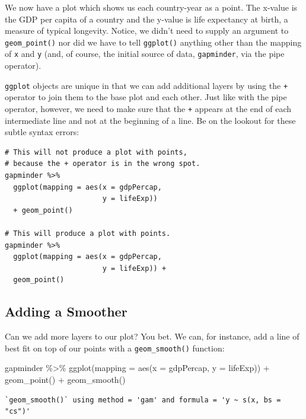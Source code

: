 \documentclass[
  letterpaper,
]{book}
\newenvironment{Shaded}{\begin{snugshade}}{\end{snugshade}}
\newcommand{\AttributeTok}[1]{\textcolor[rgb]{0.40,0.45,0.13}{#1}}
\newcommand{\FunctionTok}[1]{\textcolor[rgb]{0.28,0.35,0.67}{#1}}
\newcommand{\NormalTok}[1]{\textcolor[rgb]{0.00,0.23,0.31}{#1}}
\newcommand{\SpecialCharTok}[1]{\textcolor[rgb]{0.37,0.37,0.37}{#1}}
\begin{document}
We now have a plot which shows us each country-year as a point. The
x-value is the GDP per capita of a country and the y-value is life
expectancy at birth, a measure of typical longevity. Notice, we didn't
need to supply an argument to \texttt{geom\_point()} nor did we have to
tell \texttt{ggplot()} anything other than the mapping of \texttt{x} and
\texttt{y} (and, of course, the initial source of data,
\texttt{gapminder}, via the pipe operator).

\texttt{ggplot} objects are unique in that we can add additional layers
by using the \texttt{+} operator to join them to the base plot and each
other. Just like with the pipe operator, however, we need to make sure
that the \texttt{+} appears at the end of each intermediate line and not
at the beginning of a line. Be on the lookout for these subtle syntax
errors:

\begin{verbatim}
# This will not produce a plot with points, 
# because the + operator is in the wrong spot.
gapminder %>%
  ggplot(mapping = aes(x = gdpPercap, 
                       y = lifeExp)) 
  + geom_point()
  
# This will produce a plot with points.
gapminder %>%
  ggplot(mapping = aes(x = gdpPercap, 
                       y = lifeExp)) +
  geom_point()
\end{verbatim}

\hypertarget{adding-a-smoother}{%
\subsection{Adding a Smoother}\label{adding-a-smoother}}

Can we add more layers to our plot? You bet. We can, for instance, add a
line of best fit on top of our points with a \texttt{geom\_smooth()}
function:

\begin{Shaded}
\begin{Highlighting}[]
\NormalTok{gapminder }\SpecialCharTok{\%\textgreater{}\%}
  \FunctionTok{ggplot}\NormalTok{(}\AttributeTok{mapping =} \FunctionTok{aes}\NormalTok{(}\AttributeTok{x =}\NormalTok{ gdpPercap, }
                       \AttributeTok{y =}\NormalTok{ lifeExp)) }\SpecialCharTok{+}
  \FunctionTok{geom\_point}\NormalTok{() }\SpecialCharTok{+} 
  \FunctionTok{geom\_smooth}\NormalTok{()}
\end{Highlighting}
\end{Shaded}

\begin{verbatim}
`geom_smooth()` using method = 'gam' and formula = 'y ~ s(x, bs = "cs")'
\end{verbatim}
\end{document}
